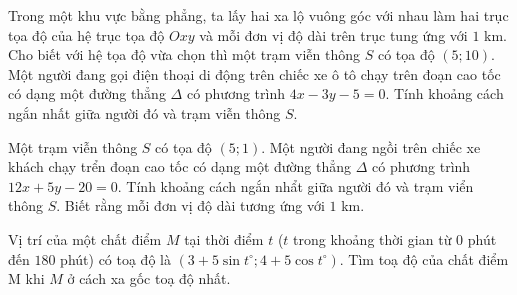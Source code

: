 \begin{bt}%
	Trong một khu vực bằng phẳng, ta lấy hai xa lộ vuông góc với nhau làm hai trục tọa độ của hệ trục tọa độ $Oxy$ và mỗi đơn vị độ dài trên trục tung ứng với $1$ km. Cho biết với hệ tọa độ vừa chọn thì một trạm viễn thông $S$ có tọa độ $(5;10)$. Một người đang gọi điện thoại di động trên chiếc xe ô tô chạy trên đoạn cao tốc có dạng một đường thẳng $\Delta$ có phương trình $4x-3y-5=0$. Tính khoảng cách ngắn nhất giữa người đó và trạm viễn thông $S$.
\end{bt}

\begin{bt}%
	Một trạm viễn thông $S$ có tọa độ $(5;1)$. Một người đang ngồi trên chiếc xe khách chạy trển đoạn cao tốc có dạng một đường thẳng $\Delta$ có phương trình $12x+5y-20=0$. Tính khoảng cách ngắn nhẩt giữa người đó và trạm viển thông $S$. Biết rằng mỗi đơn vị độ dài tương ứng với $1$ km.
\end{bt}

\begin{bt}%
  Vị trí của một chất điểm $M$ tại thời điểm $t$ ($t$ trong khoảng thời gian từ $0$ phút đến $180$ phút) có toạ độ là $\left(3+5 \sin t^\circ ; 4+5 \cos t^\circ\right)$. Tìm toạ độ của chất điểm M khi $M$ ở cách xa gốc toạ độ nhất.
  \end{bt}

